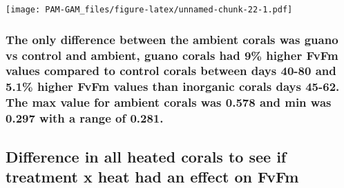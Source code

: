 \documentclass[
]{article}
\newenvironment{Shaded}{\begin{snugshade}}{\end{snugshade}}
\newcommand{\AttributeTok}[1]{\textcolor[rgb]{0.13,0.29,0.53}{#1}}
\newcommand{\CommentTok}[1]{\textcolor[rgb]{0.56,0.35,0.01}{\textit{#1}}}
\newcommand{\DecValTok}[1]{\textcolor[rgb]{0.00,0.00,0.81}{#1}}
\newcommand{\FunctionTok}[1]{\textcolor[rgb]{0.13,0.29,0.53}{\textbf{#1}}}
\newcommand{\NormalTok}[1]{#1}
\newcommand{\SpecialCharTok}[1]{\textcolor[rgb]{0.81,0.36,0.00}{\textbf{#1}}}
\begin{document}
\begin{Shaded}
\end{Shaded}

\texttt{[image: PAM-GAM\_files/figure-latex/unnamed-chunk-22-1.pdf]}

\hypertarget{the-only-difference-between-the-ambient-corals-was-guano-vs-control-and-ambient-guano-corals-had-9-higher-fvfm-values-compared-to-control-corals-between-days-40-80-and-5.1-higher-fvfm-values-than-inorganic-corals-days-45-62.-the-max-value-for-ambient-corals-was-0.578-and-min-was-0.297-with-a-range-of-0.281.}{%
\subsubsection{The only difference between the ambient corals was guano
vs control and ambient, guano corals had 9\% higher FvFm values compared
to control corals between days 40-80 and 5.1\% higher FvFm values than
inorganic corals days 45-62. The max value for ambient corals was 0.578
and min was 0.297 with a range of
0.281.}\label{the-only-difference-between-the-ambient-corals-was-guano-vs-control-and-ambient-guano-corals-had-9-higher-fvfm-values-compared-to-control-corals-between-days-40-80-and-5.1-higher-fvfm-values-than-inorganic-corals-days-45-62.-the-max-value-for-ambient-corals-was-0.578-and-min-was-0.297-with-a-range-of-0.281.}}

\hypertarget{difference-in-all-heated-corals-to-see-if-treatment-x-heat-had-an-effect-on-fvfm-2}{%
\subsection{Difference in all heated corals to see if treatment x heat
had an effect on
FvFm}\label{difference-in-all-heated-corals-to-see-if-treatment-x-heat-had-an-effect-on-fvfm-2}}
\end{document}
